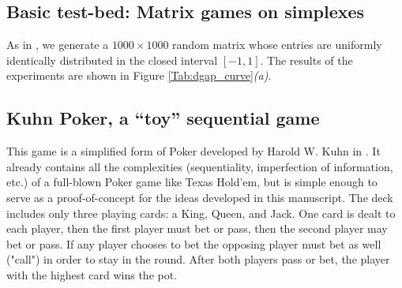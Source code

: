 \documentclass[a4paper,9pt]{extarticle}
\begin{document}
\subsection{Basic test-bed: Matrix games on simplexes}
As in \cite{nesterov2005a,chambolle2014ergodic}, we generate a $1000
\times 1000$ random matrix whose entries are uniformly identically
distributed in the closed interval $[-1, 1]$. %
The results of the experiments are shown in Figure
\ref{Tab:dgap_curve}\textit{(a)}.

\subsection{Kuhn Poker, a ``toy'' sequential game} This game is a
simplified form of Poker
developed by Harold W. Kuhn in \cite{kuhn}. It already contains all
the complexities (sequentiality, imperfection of information, etc.) of
a full-blown Poker game like Texas Hold'em, but is simple enough to
serve as a proof-of-concept for the ideas developed in this
manuscript. The deck includes only three playing
cards: a King, Queen, and Jack. One card is dealt to each player, then
the first player must bet or pass, then the second player may bet or
pass. If any player chooses
to bet the opposing player must bet as well ("call") in order to stay
in the round. After both players pass or bet, the player with the
highest card wins the pot. %
\end{document}
